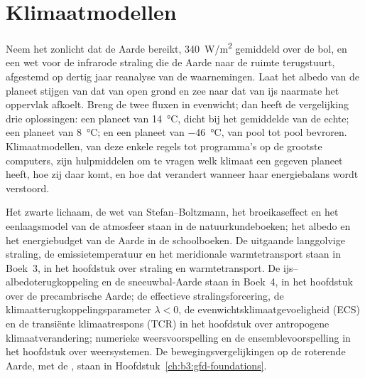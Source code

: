 \chapter{Klimaatmodellen}\label{ch:b3:climate-models}

Neem het zonlicht dat de Aarde bereikt, \qty{340}{W/m^2} gemiddeld over de
bol, en een wet voor de infrarode straling die de Aarde naar de ruimte terugstuurt, afgestemd op
dertig jaar reanalyse van de waarnemingen. Laat het albedo van de planeet stijgen van dat van
open grond en zee naar dat van ijs naarmate het oppervlak afkoelt. Breng de twee
fluxen in evenwicht; dan heeft de vergelijking drie oplossingen: een planeet van
\qty{14}{\celsius}, dicht bij het gemiddelde van de echte; een planeet van
\qty{8}{\celsius}; en een planeet van \qty{-46}{\celsius}, van
pool tot pool bevroren. Klimaatmodellen, van deze
enkele regels tot programma's op de grootste computers, zijn hulpmiddelen om te vragen welk klimaat een gegeven planeet heeft, hoe zij
daar komt, en hoe dat verandert wanneer haar energiebalans wordt verstoord.

\begin{recall}
Het zwarte lichaam, de wet van Stefan--Boltzmann, het broeikaseffect en het
eenlaagsmodel van de atmosfeer staan in de natuurkundeboeken; het albedo en
het energiebudget van de Aarde in de schoolboeken. De uitgaande langgolvige
straling, de emissietemperatuur en het meridionale warmtetransport staan
in Boek~3, in het hoofdstuk over straling en warmtetransport. De
ijs--albedoterugkoppeling en de sneeuwbal-Aarde staan in Boek~4, in
het hoofdstuk over de precambrische Aarde; de effectieve stralingsforcering, de
klimaatterugkoppelingsparameter $\lambda < 0$, de evenwichtsklimaatgevoeligheid
(ECS) en de transiënte klimaatrespons (TCR) in het hoofdstuk
over antropogene klimaatverandering; numerieke weersvoorspelling en de
ensemblevoorspelling in het hoofdstuk over weersystemen. De bewegingsvergelijkingen
op de roterende Aarde, met de , staan in
Hoofdstuk~\ref{ch:b3:gfd-foundations}.
\end{recall}

